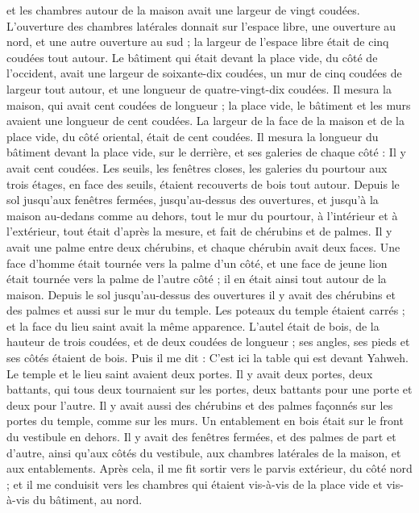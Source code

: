 \begin{multicols}{2}
et les chambres autour de la maison avait une largeur de vingt coudées.
L'ouverture des chambres latérales donnait sur l’espace libre, une ouverture au nord, et une autre ouverture au sud ; la largeur de l’espace libre était de cinq coudées tout autour.
Le bâtiment qui était devant la place vide, du côté de l’occident, avait une largeur de soixante-dix coudées, un mur de cinq coudées de largeur tout autour, et une longueur de quatre-vingt-dix coudées.
Il mesura la maison, qui avait cent coudées de longueur ; la place vide, le bâtiment et les murs avaient une longueur de cent coudées.
La largeur de la face de la maison et de la place vide, du côté oriental, était de cent coudées.
Il mesura la longueur du bâtiment devant la place vide, sur le derrière, et ses galeries de chaque côté : Il y avait cent coudées.
Les seuils, les fenêtres closes, les galeries du pourtour aux trois étages, en face des seuils, étaient recouverts de bois tout autour. Depuis le sol jusqu’aux fenêtres fermées,
jusqu’au-dessus des ouvertures, et jusqu’à la maison au-dedans comme au dehors, tout le mur du pourtour, à l’intérieur et à l’extérieur, tout était d’après la mesure,
et fait de chérubins et de palmes. Il y avait une palme entre deux chérubins, et chaque chérubin avait deux faces.
Une face d'homme était tournée vers la palme d'un côté, et une face de jeune lion était tournée vers la palme de l'autre côté ; il en était ainsi tout autour de la maison.
Depuis le sol jusqu’au-dessus des ouvertures il y avait des chérubins et des palmes et aussi sur le mur du temple.
Les poteaux du temple étaient carrés ; et la face du lieu saint avait la même apparence.
L'autel était de bois, de la hauteur de trois coudées, et de deux coudées de longueur ; ses angles, ses pieds et ses côtés étaient de bois. Puis il me dit : C'est ici la table qui est devant Yahweh.
Le temple et le lieu saint avaient deux portes.
Il y avait deux portes, deux battants, qui tous deux tournaient sur les portes, deux battants pour une porte et deux pour l’autre.
Il y avait aussi des chérubins et des palmes façonnés sur les portes du temple, comme sur les murs. Un entablement en bois était sur le front du vestibule en dehors.
Il y avait des fenêtres fermées, et des palmes de part et d’autre, ainsi qu’aux côtés du vestibule, aux chambres latérales de la maison, et aux entablements.
\VerseOne{}Après cela, il me fit sortir vers le parvis extérieur, du côté nord ; et il me conduisit vers les chambres qui étaient vis-à-vis de la place vide et vis-à-vis du bâtiment, au nord.

\end{multicols}
